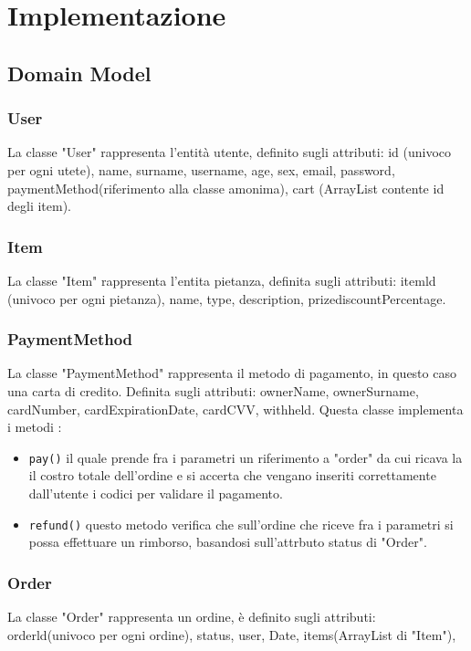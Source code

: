 \documentclass{article}
\begin{document}
\clearpage

\section{Implementazione}

\subsection{Domain Model}
\subsubsection{User}
La classe "User" rappresenta l'entità utente, definito sugli attributi: id (univoco per ogni utete), name, surname, username, age, sex, email, password, paymentMethod(riferimento alla classe amonima), cart (ArrayList contente id degli item).

\subsubsection{Item}
La classe "Item" rappresenta l'entita pietanza, definita sugli attributi: itemld (univoco per ogni pietanza), name, type, description, prizediscountPercentage.

\subsubsection{PaymentMethod}
La classe "PaymentMethod" rappresenta il metodo di pagamento, in questo caso una carta di credito. Definita sugli attributi: ownerName, ownerSurname, cardNumber, cardExpirationDate,
cardCVV, withheld. Questa classe implementa i metodi : 

\begin{itemize}
    \item \texttt{pay()} il quale prende fra i parametri un riferimento a "order" da cui ricava la il costro totale dell'ordine e si accerta che vengano inseriti correttamente dall'utente i codici per validare il pagamento.

    \item \texttt{refund()} questo metodo verifica che sull'ordine che riceve fra i parametri si possa effettuare un rimborso, basandosi sull'attrbuto status di "Order".
\end{itemize}

\subsubsection{Order}
La classe "Order" rappresenta un ordine, è definito sugli attributi: orderld(univoco per ogni ordine), status, user, Date, items(ArrayList di "Item"),
\end{document}
